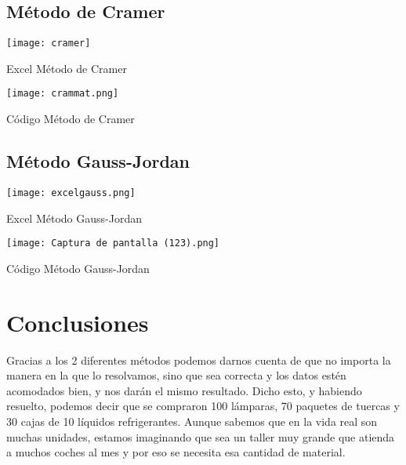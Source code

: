 \documentclass{article}
\begin{document}
\subsection{Método de Cramer}


    
    \texttt{[image: cramer]}
    \caption{Excel Método de Cramer}
    \label{fig:my_label}
    
        \texttt{[image: crammat.png]}
    \caption{Código Método de Cramer}
    \label{fig:my_label}
    
    

\subsection{Método Gauss-Jordan}
    \texttt{[image: excelgauss.png]}
    \caption{Excel Método Gauss-Jordan}
    \label{fig:my_label}
    
        \texttt{[image: Captura de pantalla (123).png]}
    \caption{Código Método Gauss-Jordan}
    \label{fig:my_label}



\section{Conclusiones}
\item Gracias a los 2 diferentes métodos podemos darnos cuenta de que no importa la manera en la que lo resolvamos, sino que sea correcta y los datos estén acomodados bien, y nos darán el mismo resultado. Dicho esto, y habiendo resuelto, podemos decir que se compraron 100 lámparas, 70 paquetes de tuercas y 30 cajas de 10 líquidos refrigerantes. Aunque sabemos que en la vida real son muchas unidades, estamos imaginando que sea un taller muy grande que atienda a muchos coches al mes y por eso se necesita esa cantidad de material. 
\end{document}
